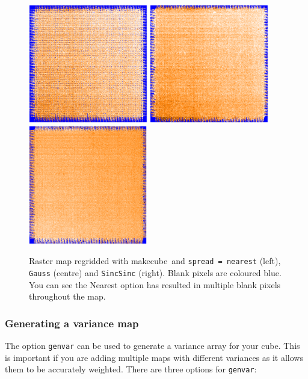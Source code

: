 \documentclass[twoside,11pt]{article}
\newcommand{\xref}[3]{#1}
\renewcommand{\_}{\texttt{\symbol{95}}}
\newcommand{\task}[1]{\textsf{#1}}
\newcommand{\param}[1]{\texttt{#1}}
\newcommand{\makecube}{\xref{\task{makecube}}{sun258}{MAKECUBE}}
\begin{document}
\begin{figure}[h!]
\begin{center}
\includegraphics[width=5.2cm, height=5.2cm]{sc20-nearest.eps}
\includegraphics[width=5.2cm, height=5.2cm]{sc20-gauss.eps}
\includegraphics[width=5.2cm, height=5.2cm]{sc20-sincsinc.eps}
\label{fig:spread}
\caption[Options for the \makecube\ parameter `spread']{Raster map regridded with \makecube\ and \param{spread = nearest} (left), \param{Gauss} (centre) and \param{SincSinc} (right). Blank pixels are coloured blue. You can see the Nearest option has resulted in multiple blank pixels throughout the map.}
\end{center}
\end{figure}



\subsubsection{Generating a variance map}
The option  \param{genvar} can be used to generate a variance array for your cube. This is important if you are adding multiple maps with different variances as it allows them to be accurately weighted. There are three options for  \param{genvar}:
\end{document}
